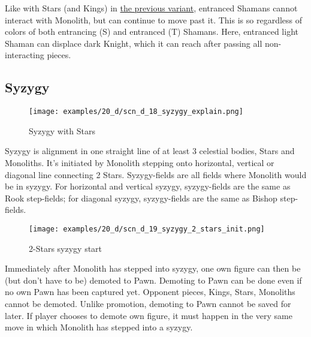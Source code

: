 Like with Stars (and Kings) in \hyperref[fig:scn_cot_18_light_light_shaman_interaction_start]{the previous variant},
entranced Shamans cannot interact with Monolith, but can continue to move past it. This is so regardless of colors
of both entrancing (S) and entranced (T) Shamans. Here, entranced light Shaman can displace dark Knight, which it
can reach after passing all non-interacting pieces.

\clearpage %

\subsection*{Syzygy}

\vspace*{-1.2\baselineskip}
\noindent
\begin{figure}[!h]
\texttt{[image: examples/20\_d/scn\_d\_18\_syzygy\_explain.png]}
\caption{Syzygy with Stars}
\label{fig:scn_d_18_syzygy_explain}
\end{figure}

Syzygy is alignment in one straight line of at least 3 celestial bodies, Stars and Monoliths. It's initiated by
Monolith stepping onto horizontal, vertical or diagonal line connecting 2 Stars. Syzygy-fields are all fields
where Monolith would be in syzygy. For horizontal and vertical syzygy, syzygy-fields are the same as Rook
step-fields; for diagonal syzygy, syzygy-fields are the same as Bishop step-fields.

\clearpage %

\noindent
\begin{figure}[!h]
\texttt{[image: examples/20\_d/scn\_d\_19\_syzygy\_2\_stars\_init.png]}
\caption{2-Stars syzygy start}
\label{fig:scn_d_19_syzygy_2_stars_init}
\end{figure}

Immediately after Monolith has stepped into syzygy, one own figure can then be (but don't have to be) demoted
to Pawn. Demoting to Pawn can be done even if no own Pawn has been captured yet. Opponent pieces, Kings, Stars,
Monoliths cannot be demoted. Unlike promotion, demoting to Pawn cannot be saved for later. If player chooses to
demote own figure, it must happen in the very same move in which Monolith has stepped into a syzygy.


